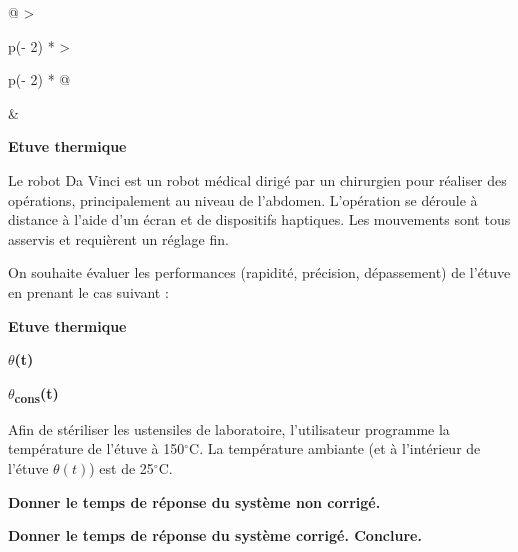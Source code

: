 \begin{longtable}[]{@{}
  >{\raggedright\arraybackslash}p{(\columnwidth - 2\tabcolsep) * }
  >{\raggedright\arraybackslash}p{(\columnwidth - 2\tabcolsep) * }@{}}
\toprule\noalign{}
\begin{minipage}[b]{\linewidth}\raggedright
\begin{quote}
\end{quote}
\end{minipage} & \begin{minipage}[b]{\linewidth}\raggedright
{}\textbf{Etuve
thermique}

Le robot Da Vinci est un robot médical dirigé par un chirurgien pour
réaliser des opérations, principalement au niveau de l'abdomen.
L'opération se déroule à distance à l'aide d'un écran et de dispositifs
haptiques. Les mouvements sont tous asservis et requièrent un réglage
fin.

On souhaite évaluer les performances (rapidité, précision, dépassement)
de l'étuve en prenant le cas suivant :

\textbf{Etuve thermique}

\textbf{$\theta$(t)}

\textbf{$\theta$\textsubscript{cons}(t)}

Afin de stériliser les ustensiles de laboratoire, l'utilisateur
programme la température de l'étuve à 150$^\circ$C. La température ambiante (et
à l'intérieur de l'étuve \(\theta(t)\)) est de 25$^\circ$C.

\textbf{Donner le temps de réponse du système non corrigé.}


\textbf{Donner le temps de réponse du système corrigé. Conclure.}

\end{minipage} \\
\midrule\noalign{}
\endhead
\bottomrule\noalign{}
\endlastfoot
\end{longtable}

